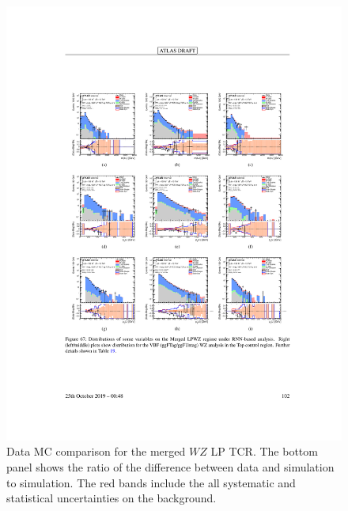 \begin{figure}[htbp]
  \centering
  \includegraphics{figures/Analysis/datamc/merged_lp_wz_tcr.pdf}
      \caption{Data MC comparison for the merged $WZ$ LP TCR. The bottom panel shows the ratio of the difference between data and simulation to simulation. The red bands include the all systematic and statistical uncertainties on the background. } 
  \label{fig:merged_lp_wz_TCR_datamc}
\end{figure} 
\FloatBarrier


